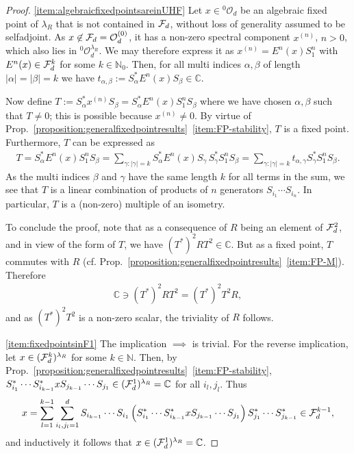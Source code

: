 \documentclass[12pt,a4paper]{amsart}
\numberwithin{equation}{section}
\theoremstyle{remark}
\def\C{\mathbb{C}}
\def\N{\mathbb{N}}
\newcommand{\la}{\lambda}
\newcommand{\CO}[0]{\mathcal{O}} \newcommand{\CP}[0]{\mathcal{P}}
\begin{document}
\begin{proof}
	\ref{item:algebraicfixedpointsareinUHF} Let $x\in{}^0\CO_d$ be an algebraic fixed point of $\la_R$ that is not contained in $\mathcal{F}_d$, without loss of generality assumed to be selfadjoint. As $x\not\in\CF_d=\CO_d^{(0)}$, it has a non-zero spectral component $x^{(n)}$, $n>0$, which also lies in ${}^0\CO_d^{\la_R}$. We may therefore express it as $x^{(n)}=E^n(x)S_1^n$ with $E^n(x)\in\mathcal{F}_d^k$ for some $k\in\N_0$. Then, for all multi indices $\alpha,\beta$ of length $|\alpha|=|\beta|=k$ we have $t_{\alpha,\beta}:=S_\alpha^* E^n(x) S_\beta\in\C$.
 
	Now define $T:=S_\alpha^* x^{(n)} S_\beta=S_\alpha^* E^n(x)S_1^nS_\beta$ where we have chosen $\alpha,\beta$ such that $T\neq0$; this is possible because $x^{(n)}\neq0$. By virtue of Prop.~\ref{proposition:generalfixedpointresults}~\ref{item:FP-stability}, $T$ is a fixed point. Furthermore, $T$ can be expressed as
	\begin{align*}
		T
		=
		S_\alpha^* E^n(x)S_1^nS_\beta=\sum_{\gamma:|\gamma|=k}S_\alpha^* E^n(x)S_\gamma\,S_\gamma^*S_1^nS_\beta
		=
		\sum_{\gamma:|\gamma|=k}t_{\alpha,\gamma}S_\gamma^*S_1^nS_\beta.
	\end{align*}
	As the multi indices $\beta$ and $\gamma$ have the same length $k$ for all terms in the sum, we see that $T$ is a linear combination of products of $n$ generators $S_{i_1}\cdots S_{i_n}$. In particular, $T$ is a (non-zero) multiple of an isometry.
  
	To conclude the proof, note that as a consequence of $R$ being an element of $\mathcal{F}_d^2$, and in view of the form of $T$, we have $(T^*)^2RT^2\in\C$. But as a fixed point, $T$ commutes with $R$ (cf. Prop.~\ref{proposition:generalfixedpointresults}~\ref{item:FP-M}). Therefore 
	\begin{align*}
	\C\ni(T^*)^2RT^2=(T^*)^2T^2R,
	\end{align*}
	and as $(T^*)^2T^2$ is a non-zero scalar, the triviality of $R$ follows.
	
	\ref{item:fixedpointsinF1} The implication $\implies$ is trivial. For the reverse implication, let $x\in(\mathcal{F}_d^k)^{\lambda_R}$ for some $k\in\N$. Then, by Prop.~\ref{proposition:generalfixedpointresults}~\ref{item:FP-stability}, $S_{i_1}^*\cdots S_{i_{k-1}}^*xS_{j_{k-1}}\cdots S_{j_1}\in(\CF_d^1)^{\lambda_R}=\C$ for all $i_l,j_l$. Thus 
	\begin{align*}
	 x=\sum_{l=1}^{k-1}\sum_{i_l,j_l=1}^dS_{i_{k-1}}\cdots S_{i_1}\left(S_{i_1}^*\cdots S_{i_{k-1}}^*xS_{j_{k-1}}\cdots S_{j_1}\right)S_{j_1}^*\cdots S_{j_{k-1}}^*\in\mathcal{F}_d^{k-1},
	\end{align*}
	and inductively it follows that $x\in(\CF_d^1)^{\lambda_R}=\C$.
\end{proof}
\end{document}
